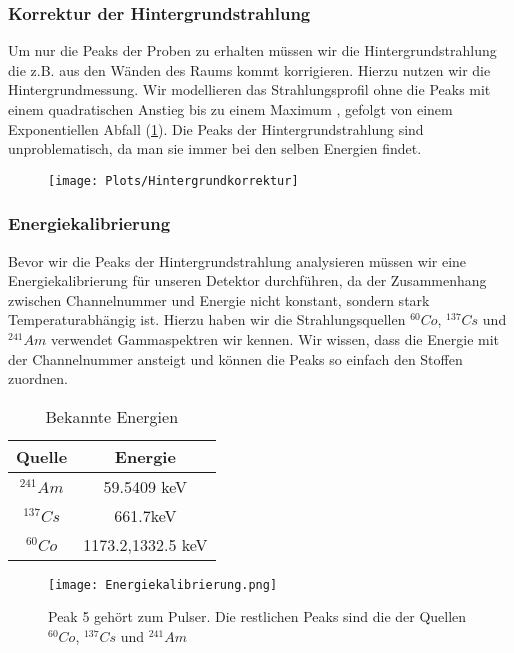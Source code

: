 \documentclass[]{article}
\begin{document}
	
	
	\subsubsection{Korrektur der Hintergrundstrahlung}
	Um nur die Peaks der Proben zu erhalten müssen wir die Hintergrundstrahlung die z.B. aus den Wänden des Raums kommt korrigieren. Hierzu nutzen wir die Hintergrundmessung. Wir modellieren das Strahlungsprofil ohne die Peaks mit einem quadratischen Anstieg bis zu einem Maximum , gefolgt von einem Exponentiellen Abfall (\ref{fig:hintergrundkorrektur}). Die Peaks der Hintergrundstrahlung sind unproblematisch, da man sie immer bei den selben Energien findet.
	
	\begin{figure}
		\centering
		\texttt{[image: Plots/Hintergrundkorrektur]}
		\caption{}
		\label{fig:hintergrundkorrektur}
	\end{figure}
	
	\subsubsection{Energiekalibrierung}
	Bevor wir die Peaks der Hintergrundstrahlung analysieren müssen wir eine Energiekalibrierung für unseren Detektor durchführen, da der Zusammenhang zwischen Channelnummer und Energie nicht konstant, sondern stark Temperaturabhängig ist. Hierzu haben wir die Strahlungsquellen $^{60}Co$, $^{137}Cs$ und $^{241}Am$ verwendet Gammaspektren wir kennen. Wir wissen, dass die Energie mit der Channelnummer ansteigt und können die Peaks so einfach den Stoffen zuordnen.
	
	\begin{table}[H]
		\caption{Bekannte Energien}
		\centering
		\begin{tabular}{|c|c|}
			
			\hline
			Quelle & Energie \\
			\hline 
			$^{241}Am$ & 59.5409 keV \\ 
			\hline 
			$^{137}Cs$ & 661.7keV \\ 
			\hline 
			$^{60}Co$ &  1173.2,1332.5 keV\\ 
			\hline 
			
		\end{tabular} 
	\end{table}
	\begin{figure}
		\centering
		\texttt{[image: Energiekalibrierung.png]}
		\caption{Peak 5 gehört zum Pulser. Die restlichen Peaks sind die der Quellen  $^{60}Co$, $^{137}Cs$ und $^{241}Am$}
		\label{fig:hintergrund komplett}
	\end{figure}
	
\end{document}
